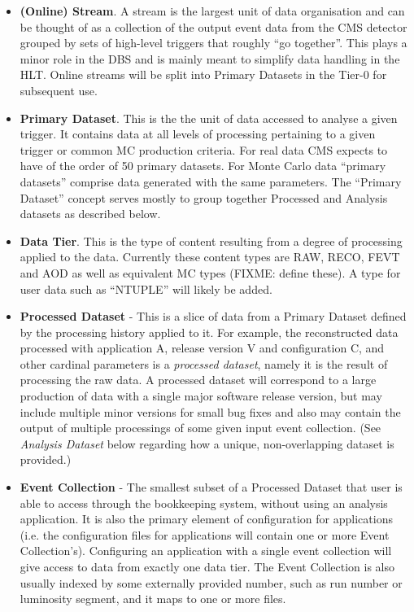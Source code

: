 \documentclass[pdftex]{cmspaper}
\begin{document}
\begin{itemize}
\item {\bf (Online) Stream}. A stream is the largest unit of data organisation
and can be thought of as a collection of the output event data from the CMS
detector grouped by sets of high-level triggers that roughly ``go together''.
This plays a minor role in the DBS and is mainly meant to simplify data 
handling in the HLT. Online streams will be split into Primary Datasets 
in the Tier-0 for subsequent use.

\item {\bf Primary Dataset}. This is the the unit of 
data accessed to analyse a given trigger.  It contains data at all levels of 
processing pertaining to a given trigger or common MC production criteria.
For real data CMS expects to have of the order of 50 primary datasets.  
For Monte Carlo data ``primary datasets'' comprise data generated with the 
same parameters. The ``Primary Dataset'' concept serves mostly to group 
together Processed and Analysis datasets as described below.

\item {\bf Data Tier}. This is the type of content resulting from a 
degree of processing applied to the data. Currently these content types
are RAW, RECO, FEVT and AOD as well as equivalent MC types (FIXME: define 
these). A type for user data such as ``NTUPLE'' will likely be added. 

\item {\bf Processed Dataset} - This is a slice of data from a Primary Dataset
defined by the processing history applied to it.  For example, the 
reconstructed data processed with application A, release version V and 
configuration C, and other cardinal parameters is a {\em processed dataset}, 
namely it is the result of processing the raw data. A processed dataset
will correspond to a large production of data with a single major software
release version, but may include multiple minor versions for small bug
fixes and also may contain the output of multiple processings of some 
given input event collection. (See {\em Analysis Dataset} below regarding
how a unique, non-overlapping dataset is provided.)

\item{\bf Event Collection} - The smallest subset of a Processed Dataset that
user is able to access through the bookkeeping system, without using an
analysis application. It is also the primary element of configuration for
applications (i.e. the configuration files for applications will contain
one or more Event Collection's). Configuring an application with a single
event collection will give access to data from exactly one data tier. The 
Event Collection is also usually indexed by some externally provided number, 
such as run number or luminosity segment, and it maps to one or more files. 


\end{itemize}
\end{document}
